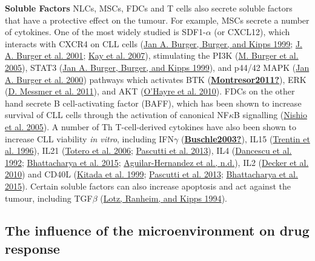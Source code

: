 \documentclass[11pt, a4paper, twosided]{book}
\begin{document}
\textbf{Soluble Factors}
NLCs, MSCs, FDCs and T cells also secrete soluble factors that have a protective effect on the tumour. For example, MSCs secrete a number of cytokines. One of the most widely studied is SDF1-\(\alpha\) (or CXCL12), which interacts with CXCR4 on CLL cells (\protect\hyperlink{ref-Burger1999}{Jan A. Burger, Burger, and Kipps 1999}; \protect\hyperlink{ref-Burger2001}{J. A. Burger et al. 2001}; \protect\hyperlink{ref-Kay2007}{Kay et al. 2007}), stimulating the PI3K (\protect\hyperlink{ref-Burger2005}{M. Burger et al. 2005}), STAT3 (\protect\hyperlink{ref-Burger1999}{Jan A. Burger, Burger, and Kipps 1999}), and p44/42 MAPK (\protect\hyperlink{ref-Burger2000}{Jan A. Burger et al. 2000}) pathways which activates BTK (\protect\hyperlink{ref-Montresor2011}{\textbf{Montresor2011?}}), ERK (\protect\hyperlink{ref-Messmer2011}{D. Messmer et al. 2011}), and AKT (\protect\hyperlink{ref-OHayre2010}{O'Hayre et al. 2010}). FDCs on the other hand secrete B cell-activating factor (BAFF), which has been shown to increase survival of CLL cells through the activation of canonical NF\(\kappa\)B signalling (\protect\hyperlink{ref-Nishio2005}{Nishio et al. 2005}). A number of Th T-cell-derived cytokines have also been shown to increase CLL viability \emph{in vitro}, including IFN\(\gamma\) (\protect\hyperlink{ref-Buschle2003}{\textbf{Buschle2003?}}), IL15 (\protect\hyperlink{ref-Trentin1996}{Trentin et al. 1996}), IL21 (\protect\hyperlink{ref-deTotero2006}{Totero et al. 2006}; \protect\hyperlink{ref-Pascutti2013}{Pascutti et al. 2013}), IL4 (\protect\hyperlink{ref-Dancescu1992}{Dancescu et al. 1992}; \protect\hyperlink{ref-Bhattacharya2015}{Bhattacharya et al. 2015}; \protect\hyperlink{ref-AguilarHernandez2016}{Aguilar-Hernandez et al., n.d.}), IL2 (\protect\hyperlink{ref-Decker2010}{Decker et al. 2010}) and CD40L (\protect\hyperlink{ref-Kitada1999}{Kitada et al. 1999}; \protect\hyperlink{ref-Pascutti2013}{Pascutti et al. 2013}; \protect\hyperlink{ref-Bhattacharya2015}{Bhattacharya et al. 2015}). Certain soluble factors can also increase apoptosis and act against the tumour, including TGF\(\beta\) (\protect\hyperlink{ref-Lotz1994}{Lotz, Ranheim, and Kipps 1994}).

\hypertarget{intro-microenvironment-drug-response}{%
\subsection{The influence of the microenvironment on drug response}\label{intro-microenvironment-drug-response}}
\end{document}

